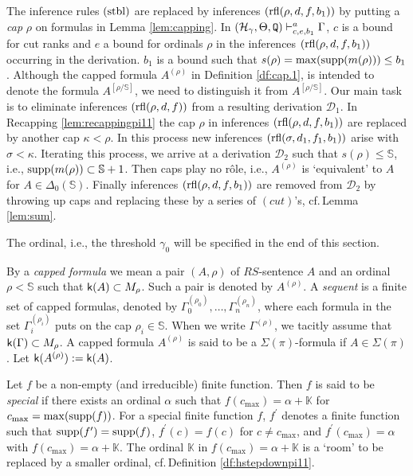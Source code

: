 \documentclass{article}
\newcommand{\mS}{\mathbb{S}}
\newcommand{\mK}{\mathbb{K}}
\begin{document}
The inference rules $({\rm stbl})$ are replaced by inferences $({\rm rfl}(\rho,d,f,b_{1}))$
by putting a \textit{cap} $\rho$ on formulas 
 in Lemma \ref{lem:capping}. 
 In $(\mathcal{H}_{\gamma},\Theta,{\tt Q})\vdash^{a}_{c,e,b_{1}} \Gamma$, $c$ is a bound for cut ranks
 and $e$ a bound for ordinals $\rho$ in the inferences $({\rm rfl}(\rho,d,f,b_{1}))$ occurring in the derivation.
$b_{1}$ is a bound such that $s(\rho)=\max({\rm supp}(m(\rho)))\leq b_{1}$.
 Although the capped formula $A^{(\rho)}$ in Definition \ref{df:cap.1},
 is intended to denote the formula $A^{[\rho/\mathbb{S}]}$,
we need to distinguish it from $A^{[\rho/\mathbb{S}]}$.
Our main task is to eliminate inferences $({\rm rfl}(\rho,d,f))$ from a resulting derivation $\mathcal{D}_{1}$.
In Recapping \ref{lem:recappingpi11} the cap $\rho$ in inferences $({\rm rfl}(\rho,d,f,b_{1}))$
are replaced by another cap $\kappa<\rho$.
In this process new inferences $({\rm rfl}(\sigma,d_{1},f_{1},b_{1}))$ arise with $\sigma<\kappa$.
Iterating this process,
we arrive at a derivation $\mathcal{D}_{2}$ such that
$s(\rho)\leq\mathbb{S}$, i.e., ${\rm supp}(m(\rho))\subset\mS+1$.
Then caps play no r\^{o}le, i.e.,
$A^{(\rho)}$ is `equivalent' to $A$ for $A\in\Delta_{0}(\mathbb{S})$.
Finally inferences $({\rm rfl}(\rho,d,f,b_{1}))$ are removed from $\mathcal{D}_{2}$ by 
throwing up caps and replacing 
these by a series of $(cut)$'s,
cf.\,Lemma \ref{lem:sum}.



The ordinal, i.e., the threshold $\gamma_{0}$ will be specified 
in the end of this section.




\bdf\label{df:cap.1}
{\rm
By a \textit{capped formula} we mean a pair $(A,\rho)$ of $RS$-sentence $A$
and an ordinal 
$\rho<\mathbb{S}$ such that
${\sf k}(A)\subset M_{\rho}$.
Such a pair is denoted by $A^{(\rho)}$.
A \textit{sequent} is a finite set of capped 
formulas, denoted by
$\Gamma_{0}^{(\rho_{0})},\ldots,\Gamma_{n}^{(\rho_{n})}$,
where each formula in the set $\Gamma_{i}^{(\rho_{i})}$ puts on the cap 
$\rho_{i}\in\mathbb{S}$.
When we write $\Gamma^{(\rho)}$, we tacitly assume that
${\sf k}(\Gamma)\subset M_{\rho}$.
A capped formula $A^{(\rho)}$ is said to be a $\Sigma(\pi)$-formula if
$A\in\Sigma(\pi)$.
Let ${\sf k}(A^{(\rho)}):={\sf k}(A)$.
}
\edf
 


\bdf\label{df:special}
{\rm 
Let $f$ be a non-empty (and irreducible) finite function.
Then $f$ is said to be \textit{special} if there exists an ordinal $\alpha$
such that $f(c_{\max})=\alpha+\mathbb{K}$ for $c_{\max}=\max({\rm supp}(f))$.
For a special finite function $f$, $f^{\prime}$ denotes a finite function such that
${\rm supp}(f^{\prime})={\rm supp}(f)$,
$f^{\prime}(c)=f(c)$ for $c\neq c_{\max}$, and
$f^{\prime}(c_{\max})=\alpha$ with $f(c_{\max})=\alpha+\mathbb{K}$.
}
\edf
The ordinal $\mK$ in $f(c_{\max})=\alpha+\mathbb{K}$ is a `room'
to be replaced by a smaller ordinal, cf.\,Definition \ref{df:hstepdownpi11}.
\end{document}
